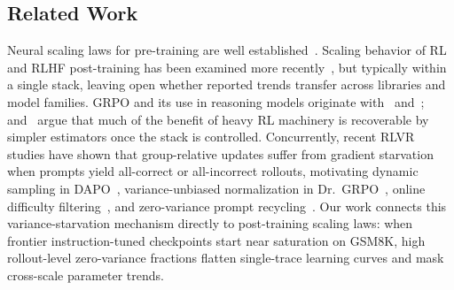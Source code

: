 \subsection{Related Work}
\label{sec:p1-related}
Neural scaling laws for pre-training are well established~\citep{kaplan2020scalinglaws, hoffmann2022chinchilla, muennighoff2023datascaling}. Scaling behavior of RL and
RLHF post-training has been examined more recently~\citep{hilton2023rlscaling, gao2023reward, rafailov2024rlhfscaling, nimmaturi2025predictive, tan2025scalingrl}, but typically within a single
stack, leaving open whether reported trends transfer across libraries and model
families. GRPO and its use in reasoning models originate
with~\citet{shao2024deepseekmath} and~\citet{guo2025deepseekr1};
\citet{ahmadian2024backtobasics} and~\citet{li2026oxrl} argue that much of the benefit of heavy RL
machinery is recoverable by simpler estimators once the stack is controlled.
Concurrently, recent RLVR studies have shown that group-relative updates suffer from gradient starvation when prompts yield all-correct or all-incorrect rollouts, motivating dynamic sampling in DAPO~\citep{yu2025dapo}, variance-unbiased normalization in Dr.\ GRPO~\citep{tong2025drgrpo}, online difficulty filtering~\citep{bae2025online, jiang2025vcrl}, and zero-variance prompt recycling~\citep{le2025rlzvp, zhang2026greso}.
Our work connects this variance-starvation mechanism directly to post-training scaling laws: when frontier instruction-tuned checkpoints start near saturation on GSM8K, high rollout-level zero-variance fractions flatten single-trace learning curves and mask cross-scale parameter trends.
